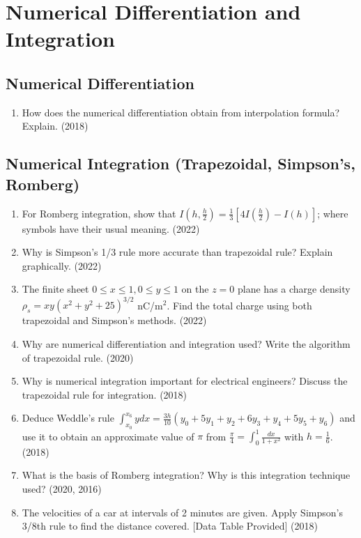 \documentclass[12pt, a4paper]{article}
\begin{document}
	
	\section{Numerical Differentiation and Integration}
	\subsection{Numerical Differentiation}
	\begin{enumerate}
		\item How does the numerical differentiation obtain from interpolation formula? Explain. (2018)
	\end{enumerate}
	
	\subsection{Numerical Integration (Trapezoidal, Simpson's, Romberg)}
	\begin{enumerate}
		\item For Romberg integration, show that $I(h, \frac{h}{2}) = \frac{1}{3}[4I(\frac{h}{2}) - I(h)]$; where symbols have their usual meaning. (2022)
		\item Why is Simpson's 1/3 rule more accurate than trapezoidal rule? Explain graphically. (2022)
		\item The finite sheet $0 \le x \le 1, 0 \le y \le 1$ on the $z=0$ plane has a charge density $\rho_s = xy(x^2 + y^2 + 25)^{3/2}$ nC/m$^2$. Find the total charge using both trapezoidal and Simpson's methods. (2022)
		\item Why are numerical differentiation and integration used? Write the algorithm of trapezoidal rule. (2020)
		\item Why is numerical integration important for electrical engineers? Discuss the trapezoidal rule for integration. (2018)
		\item Deduce Weddle's rule $\int_{x_0}^{x_6} y dx = \frac{3h}{10}(y_0+5y_1+y_2+6y_3+y_4+5y_5+y_6)$ and use it to obtain an approximate value of $\pi$ from $\frac{\pi}{4} = \int_0^1 \frac{dx}{1+x^2}$ with $h=\frac{1}{6}$. (2018)
		\item What is the basis of Romberg integration? Why is this integration technique used? (2020, 2016)
		\item The velocities of a car at intervals of 2 minutes are given. Apply Simpson's 3/8th rule to find the distance covered. [Data Table Provided] (2018)
	\end{enumerate}
	
\end{document}
